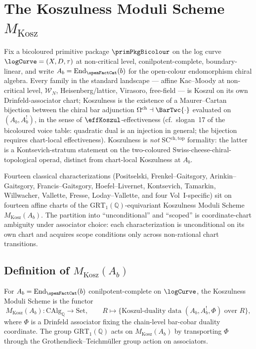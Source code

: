 \chapter{The Koszulness Moduli Scheme $M_{\mathrm{Kosz}}$}
\label{chap:koszulness-moduli}

Fix a bicoloured primitive package $\primPkgBicolour$ on the log curve
$\logCurve = (X, D, \tau)$ at non-critical level, conilpotent-complete,
boundary-linear, and write $A_b = \mathrm{End}_{\openFactCat}(b)$ for the
open-colour endomorphism chiral algebra. Every family in the standard
landscape — affine Kac--Moody at non-critical level, $\mathcal{W}_N$,
Heisenberg/lattice, Virasoro, free-field — is Koszul on its own
Drinfeld-associator chart; Koszulness is the existence of a Maurer--Cartan
bijection between the chiral bar adjunction $\Omega^{\mathrm{ch}} \dashv
\BarTwc{\cdot}$ evaluated on $(A_b, A_b^{!})$, in the sense of
\(\effKoszul\)-effectiveness (cf.\ slogan~17 of the bicoloured voice
table: quadratic dual is an injection in general; the bijection requires
chart-local effectiveness). Koszulness is \emph{not} SC$^{\mathrm{ch,top}}$
formality: the latter is a Kontsevich-stratum statement on the
two-coloured Swiss-cheese-chiral-topological operad, distinct from
chart-local Koszulness at $A_b$.
\par
Fourteen classical characterizations (Positselski, Frenkel--Gaitsgory,
Arinkin--Gaitsgory, Francis--Gaitsgory, Hoefel--Livernet, Kontsevich,
Tamarkin, Willwacher, Vallette, Fresse, Loday--Vallette, and four
Vol~I-specific) sit on fourteen affine charts of the
$\mathrm{GRT}_1(\mathbb{Q})$-equivariant Koszulness Moduli Scheme
$M_{\mathrm{Kosz}}(A_b)$. The partition into ``unconditional'' and
``scoped'' is coordinate-chart ambiguity under associator choice: each
characterization is unconditional on its own chart and acquires scope
conditions only across non-rational chart transitions.

\section{Definition of $M_{\mathrm{Kosz}}(A_b)$}
\label{sec:mkosz-definition}

\begin{definition}
\label{def:mkosz}
For $A_b = \mathrm{End}_{\openFactCat}(b)$ conilpotent-complete on
$\logCurve$, the Koszulness Moduli Scheme is the functor
\[
 M_{\mathrm{Kosz}}(A_b) :
 \mathrm{CAlg}_{\mathbb{Q}} \to \mathrm{Set},
 \qquad
 R \mapsto
 \{\text{Koszul-duality data } (A_b, A_b^{!}, \Phi) \text{ over } R\},
\]
where $\Phi$ is a Drinfeld associator fixing the chain-level bar-cobar
duality coordinate. The group $\mathrm{GRT}_1(\mathbb{Q})$ acts on
$M_{\mathrm{Kosz}}(A_b)$ by transporting $\Phi$ through the
Grothendieck--Teichm\"uller group action on associators.
\end{definition}

